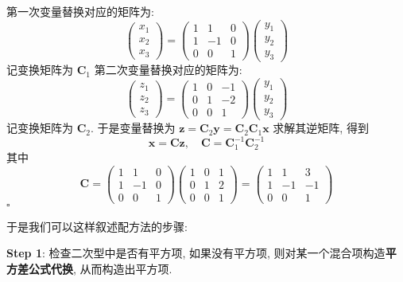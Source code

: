 \documentclass[UTF8]{book}
\newenvironment{solution}{{\noindent\it Solution.} }{\hfill $\square$\par}
\begin{document}
\begin{solution}
    第一次变量替换对应的矩阵为: 
    $$\begin{pmatrix}x_1\\x_2\\x_3\end{pmatrix}
    =\begin{pmatrix}1&1&0\\1& - 1&0\\0&0&1\end{pmatrix}
    \begin{pmatrix}y_1\\y_2\\y_3\end{pmatrix}$$
    记变换矩阵为 $\boldsymbol{C}_1$
    第二次变量替换对应的矩阵为: 
    $$\begin{pmatrix}z_1\\z_2\\z_3\end{pmatrix}=
    \begin{pmatrix}1&0& - 1\\0&1& - 2\\0&0&1\end{pmatrix}
    \begin{pmatrix}y_1\\y_2\\y_3\end{pmatrix}$$
    记变换矩阵为 $\boldsymbol{C}_2$. 
    于是变量替换为 
    $ \boldsymbol{z} = \boldsymbol{C}_2 \boldsymbol{y} 
    = \boldsymbol{C}_2 \boldsymbol{C}_1\boldsymbol{x} $
    求解其逆矩阵, 得到 
    $$ \boldsymbol{x} = \boldsymbol{C}\boldsymbol{z},\quad
    \boldsymbol{C} = \boldsymbol{C}_1^{-1}\boldsymbol{C}_2^{-1}$$
    其中 
    $$ \boldsymbol{C} =
    \begin{pmatrix}1&1&0\\1& - 1&0\\0&0&1\end{pmatrix}
    \begin{pmatrix}1&0&1\\0&1&2\\0&0&1\end{pmatrix}
    =\begin{pmatrix}1&1&3\\1& - 1& - 1\\0&0&1\end{pmatrix}
    $$
\end{solution}

于是我们可以这样叙述配方法的步骤: 

\noindent \textbf{Step 1}: 检查二次型中是否有平方项, 
如果没有平方项, 则对某一个混合项构造\textbf{平方差公式代换}, 
从而构造出平方项. 
\end{document}
